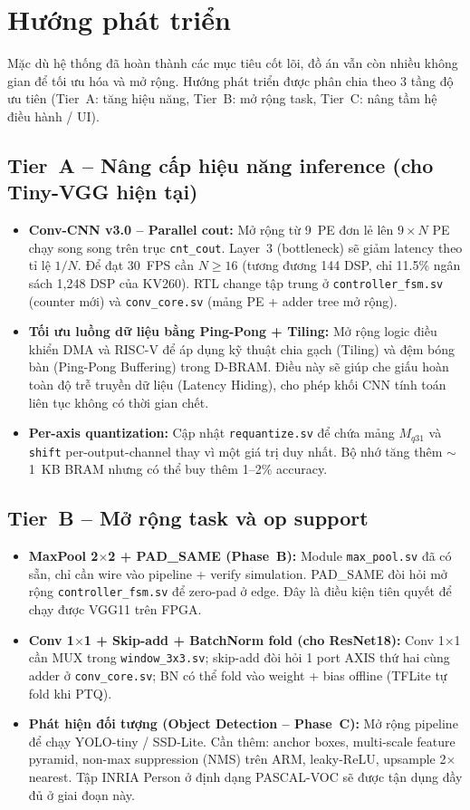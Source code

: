 \newpage
\section{Hướng phát triển}
Mặc dù hệ thống đã hoàn thành các mục tiêu cốt lõi, đồ án vẫn còn nhiều không gian để tối ưu hóa và mở rộng. Hướng phát triển được phân chia theo 3 tầng độ ưu tiên (Tier~A: tăng hiệu năng, Tier~B: mở rộng task, Tier~C: nâng tầm hệ điều hành / UI).

\subsection*{Tier~A -- Nâng cấp hiệu năng inference (cho Tiny-VGG hiện tại)}
\begin{itemize}
    \item \textbf{Conv-CNN v3.0 -- Parallel cout:} Mở rộng từ 9~PE đơn lẻ lên $9\times N$ PE chạy song song trên trục \texttt{cnt\_cout}. Layer~3 (bottleneck) sẽ giảm latency theo tỉ lệ $1/N$. Để đạt 30~FPS cần $N \geq 16$ (tương đương 144 DSP, chỉ 11.5\% ngân sách 1{,}248 DSP của KV260). RTL change tập trung ở \texttt{controller\_fsm.sv} (counter mới) và \texttt{conv\_core.sv} (mảng PE + adder tree mở rộng).
    \item \textbf{Tối ưu luồng dữ liệu bằng Ping-Pong + Tiling:} Mở rộng logic điều khiển DMA và RISC-V để áp dụng kỹ thuật chia gạch (Tiling) và đệm bóng bàn (Ping-Pong Buffering) trong D-BRAM. Điều này sẽ giúp che giấu hoàn toàn độ trễ truyền dữ liệu (Latency Hiding), cho phép khối CNN tính toán liên tục không có thời gian chết.
    \item \textbf{Per-axis quantization:} Cập nhật \texttt{requantize.sv} để chứa mảng $M_{q31}$ và \texttt{shift} per-output-channel thay vì một giá trị duy nhất. Bộ nhớ tăng thêm $\sim$1~KB BRAM nhưng có thể buy thêm 1--2\% accuracy.
\end{itemize}

\subsection*{Tier~B -- Mở rộng task và op support}
\begin{itemize}
    \item \textbf{MaxPool 2$\times$2 + PAD\_SAME (Phase~B):} Module \texttt{max\_pool.sv} đã có sẵn, chỉ cần wire vào pipeline + verify simulation. PAD\_SAME đòi hỏi mở rộng \texttt{controller\_fsm.sv} để zero-pad ở edge. Đây là điều kiện tiên quyết để chạy được VGG11 trên FPGA.
    \item \textbf{Conv 1$\times$1 + Skip-add + BatchNorm fold (cho ResNet18):} Conv 1$\times$1 cần MUX trong \texttt{window\_3x3.sv}; skip-add đòi hỏi 1 port AXIS thứ hai cùng adder ở \texttt{conv\_core.sv}; BN có thể fold vào weight + bias offline (TFLite tự fold khi PTQ).
    \item \textbf{Phát hiện đối tượng (Object Detection -- Phase~C):} Mở rộng pipeline để chạy YOLO-tiny / SSD-Lite. Cần thêm: anchor boxes, multi-scale feature pyramid, non-max suppression (NMS) trên ARM, leaky-ReLU, upsample 2$\times$ nearest. Tập INRIA Person ở định dạng PASCAL-VOC sẽ được tận dụng đầy đủ ở giai đoạn này.
\end{itemize}

